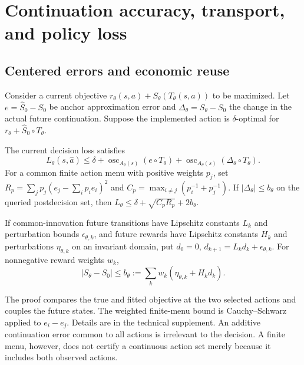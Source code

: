 \documentclass[ecta,nameyear,draft]{econsocart}
\begin{document}
\section{Continuation accuracy, transport, and policy loss}\label{sec:theory}
\subsection{Centered errors and economic reuse}
Consider a current objective $r_\theta(s,a)+S_\theta(T_\theta(s,a))$ to be maximized. Let $e=\widehat S_0-S_0$ be anchor approximation error and $\Delta_\theta=S_\theta-S_0$ the change in the actual future continuation. Suppose the implemented action is $\delta$-optimal for $r_\theta+\widehat S_0\circ T_\theta$.

\begin{proposition}\label{prop:center}
The current decision loss satisfies
\begin{equation}\label{eq:osc}
 L_\theta(s,\widehat a)\leq\delta+
 \operatorname{osc}_{A_\theta(s)}(e\circ T_\theta)+
 \operatorname{osc}_{A_\theta(s)}(\Delta_\theta\circ T_\theta).
\end{equation}
For a common finite action menu with positive weights $p_j$, set
$R_p=\sum_jp_j(e_j-\sum_ip_ie_i)^2$ and
$C_p=\max_{i\ne j}(p_i^{-1}+p_j^{-1})$. If $|\Delta_\theta|\leq b_\theta$ on the queried postdecision set, then
$L_\theta\leq\delta+\sqrt{C_pR_p}+2b_\theta$.

If common-innovation future transitions have Lipschitz constants $L_k$ and perturbation bounds $\epsilon_{\theta,k}$, and future rewards have Lipschitz constants $H_k$ and perturbations $\eta_{\theta,k}$ on an invariant domain, put $d_0=0$, $d_{k+1}=L_kd_k+\epsilon_{\theta,k}$. For nonnegative reward weights $w_k$,
\begin{equation}\label{eq:transport}
 |S_\theta-S_0|\leq b_\theta:=\sum_kw_k(\eta_{\theta,k}+H_kd_k).
\end{equation}
\end{proposition}

The proof compares the true and fitted objective at the two selected actions and couples the future states. The weighted finite-menu bound is Cauchy--Schwarz applied to $e_i-e_j$. Details are in the technical supplement. An additive continuation error common to all actions is irrelevant to the decision. A finite menu, however, does not certify a continuous action set merely because it includes both observed actions.
\end{document}

